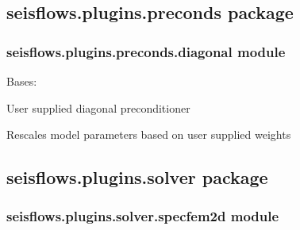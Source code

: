 \documentclass[letterpaper,10pt,english]{sphinxmanual}
\begin{document}
\subsection{seisflows.plugins.preconds package}
\label{\detokenize{ref/seisflows.plugins.preconds:seisflows-plugins-preconds-package}}\label{\detokenize{ref/seisflows.plugins.preconds::doc}}

\subsubsection{seisflows.plugins.preconds.diagonal module}
\label{\detokenize{ref/seisflows.plugins.preconds:module-seisflows.plugins.preconds.diagonal}}\label{\detokenize{ref/seisflows.plugins.preconds:seisflows-plugins-preconds-diagonal-module}}\label{\detokenize{ref/seisflows.plugins.preconds:sfprecond}}

\begin{fulllineitems}
\label{\detokenize{ref/seisflows.plugins.preconds:seisflows.plugins.preconds.diagonal.Diagonal}}
Bases: 

User supplied diagonal preconditioner

Rescales model parameters based on user supplied weights

\end{fulllineitems}



\subsection{seisflows.plugins.solver package}
\label{\detokenize{ref/seisflows.plugins.solver:seisflows-plugins-solver-package}}\label{\detokenize{ref/seisflows.plugins.solver::doc}}

\subsubsection{seisflows.plugins.solver.specfem2d module}
\label{\detokenize{ref/seisflows.plugins.solver:module-seisflows.plugins.solver.specfem2d}}\label{\detokenize{ref/seisflows.plugins.solver:seisflows-plugins-solver-specfem2d-module}}
\end{document}
